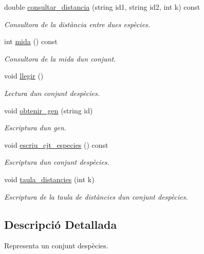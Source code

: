 \begin{DoxyCompactItemize}
double \hyperlink{class_cjt___especies_a137955c8c38747252290ea1fc26cd012}{consultar\+\_\+distancia} (string id1, string id2, int k) const
\begin{DoxyCompactList}\small\item\em Consultora de la distància entre dues espècies. \end{DoxyCompactList}\item 
int \hyperlink{class_cjt___especies_a6225eee3bd4dab0919a59633001e646b}{mida} () const
\begin{DoxyCompactList}\small\item\em Consultora de la mida d\textquotesingle{}un conjunt. \end{DoxyCompactList}\item 
void \hyperlink{class_cjt___especies_a2a0658d5acd67177881acc6f621fe2c0}{llegir} ()
\begin{DoxyCompactList}\small\item\em Lectura d\textquotesingle{}un conjunt d\textquotesingle{}espècies. \end{DoxyCompactList}\item 
void \hyperlink{class_cjt___especies_a82287a84ed59508a7a4214b8bb4cbc27}{obtenir\+\_\+gen} (string id)
\begin{DoxyCompactList}\small\item\em Escriptura d\textquotesingle{}un gen. \end{DoxyCompactList}\item 
void \hyperlink{class_cjt___especies_ab6945c71800e38fae624c94eae709f2c}{escriu\+\_\+cjt\+\_\+especies} () const
\begin{DoxyCompactList}\small\item\em Escriptura d\textquotesingle{}un conjunt d\textquotesingle{}espècies. \end{DoxyCompactList}\item 
void \hyperlink{class_cjt___especies_ad7b8b31101e1c5e652bc39cdd3423608}{taula\+\_\+distancies} (int k)
\begin{DoxyCompactList}\small\item\em Escriptura de la taula de distàncies d\textquotesingle{}un conjunt d\textquotesingle{}espècies. \end{DoxyCompactList}\end{DoxyCompactItemize}


\subsection{Descripció Detallada}
Representa un conjunt d\textquotesingle{}espècies. 


